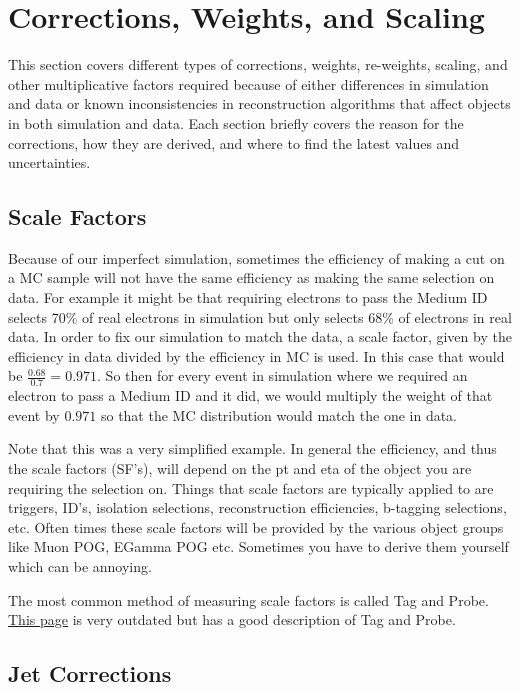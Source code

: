 \section{Corrections, Weights, and Scaling}
This section covers different types of corrections, weights, re-weights, scaling, and other multiplicative factors required because of either differences in simulation and data or known inconsistencies in reconstruction algorithms that affect objects in both simulation and data. Each section briefly covers the reason for the corrections, how they are derived, and where to find the latest values and uncertainties.

\subsection{Scale Factors}
Because of our imperfect simulation, sometimes the efficiency of making a cut on a MC sample will not have the same efficiency as making the same selection on data. 
For example it might be that requiring electrons to pass the Medium ID selects 70\% of real electrons in simulation but only selects 68\% of electrons in real data.
In order to fix our simulation to match the data, a scale factor, given by the efficiency in data divided by the efficiency in MC is used.
In this case that would be $\frac{0.68}{0.7} = 0.971$. 
So then for every event in simulation where we required an electron to pass a Medium ID and it did, we would multiply the weight of that event by $0.971$ so that 
the MC distribution would match the one in data. 

Note that this was a very simplified example. In general the efficiency, and thus the scale factors (SF's), will depend on the pt and eta of the object you are requiring the selection on.
Things that scale factors are typically applied to are triggers, ID's, isolation selections, reconstruction efficiencies, b-tagging selections, etc. 
Often times these scale factors will be provided by the various object groups like Muon POG, EGamma POG etc. Sometimes you have to derive them yourself which can be annoying. 

The most common method of measuring scale factors is called Tag and Probe.
\href{https://twiki.cern.ch/twiki/bin/view/CMSPublic/TagAndProbe}{This page} is very outdated but has a good description of Tag and Probe. 


\subsection{Jet Corrections}

